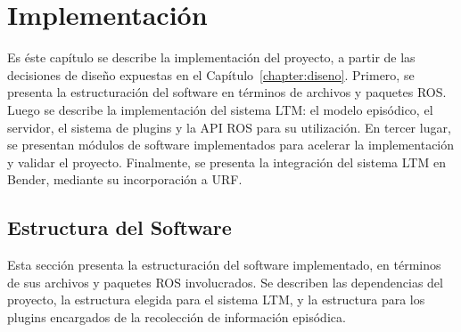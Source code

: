 \chapter{Implementación}\label{chapter:implementacion}

Es éste capítulo se describe la implementación del proyecto, a partir de las decisiones de diseño expuestas en el Capítulo~\ref{chapter:diseno}. Primero, se presenta la estructuración del software en términos de archivos y paquetes ROS. Luego se describe la implementación del sistema LTM: el modelo episódico, el servidor, el sistema de plugins y la API ROS para su utilización. En tercer lugar, se presentan módulos de software implementados para acelerar la implementación y validar el proyecto. Finalmente, se presenta la integración del sistema LTM en Bender, mediante su incorporación a URF.




\section{Estructura del Software}

Esta sección presenta la estructuración del software implementado, en términos de sus archivos y paquetes ROS involucrados. Se describen las dependencias del proyecto, la estructura elegida para el sistema LTM, y la estructura para los plugins encargados de la recolección de información episódica.

